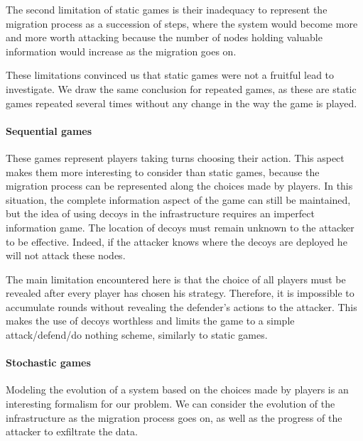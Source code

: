 The second limitation of static games is their inadequacy to represent the migration process as a succession of steps, where the system would become more and more worth attacking because the number of nodes holding valuable information would increase as the migration goes on.


These limitations convinced us that static games were not a fruitful lead to investigate.
We draw the same conclusion for repeated games, as these are static games repeated several times without any change in the way the game is played.


\paragraph{Sequential games} These games represent players taking turns choosing their action. This aspect makes them more interesting to consider than static games, because the migration process can be represented along the choices made by players. In this situation, the complete information aspect of the game can still be maintained, but the idea of using decoys in the infrastructure requires an imperfect information game. The location of decoys must remain unknown to the attacker to be effective.
Indeed, if the attacker knows where the decoys are deployed he will not attack these nodes.

The main limitation encountered here is that the choice of all players must be revealed after every player has chosen his strategy. Therefore, it is impossible to accumulate rounds without revealing the defender's actions to the attacker. This makes the use of decoys worthless and limits the game to a simple attack/defend/do nothing scheme, similarly to static games.

\paragraph{Stochastic games} Modeling the evolution of a system based on the choices made by players is an interesting formalism for our problem. We can consider the evolution of the infrastructure as the migration process goes on, as well as the progress of the attacker to exfiltrate the data. 

